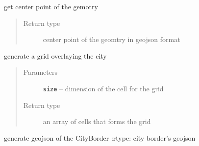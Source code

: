 \documentclass[letterpaper,10pt,english]{sphinxmanual}
\begin{document}
\begin{fulllineitems}
\begin{fulllineitems}
\label{api/map:map.models.CityBorder.center}
get center point of the gemotry
\begin{quote}\begin{description}
\item[{Return type}] \leavevmode
center point of the geomtry in geojson format

\end{description}\end{quote}

\end{fulllineitems}


\begin{fulllineitems}
\label{api/map:map.models.CityBorder.generateGrid}
generate a grid overlaying the city
\begin{quote}\begin{description}
\item[{Parameters}] \leavevmode
\textbf{\texttt{size}} -- dimension of the cell for the grid

\item[{Return type}] \leavevmode
an array of cells that forms the grid

\end{description}\end{quote}

\end{fulllineitems}


\begin{fulllineitems}
\label{api/map:map.models.CityBorder.geojson}
generate geojson of the CityBorder
:rtype: city border's geojson

\end{fulllineitems}


\begin{fulllineitems}
\label{api/map:map.models.CityBorder.geom}
\end{fulllineitems}


\begin{fulllineitems}
\label{api/map:map.models.CityBorder.objects}
\end{fulllineitems}


\end{fulllineitems}
\end{document}
